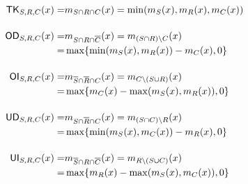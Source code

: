 \documentclass[11pt]{beamer}
\newenvironment{backblock}{%
		\begin{tcolorbox}[ 
			enhanced,
			fonttitle=\bfseries,
			colframe=gray,
			colback=gray!5!,
			colbacktitle=gray!80,
			attach boxed title to top left={yshift=-2mm, xshift=2mm}]
			\vskip2mm
			}{%
		\end{tcolorbox}
		}
\begin{document}
\begin{frame}[t]
\begin{columns}[t]
\begin{column}{0.50\linewidth}
\begin{backblock}
\begin{align*}
								\textsf{TK}_{S, R, C} (x)
								= & m_{S \cap R \cap C}(x)
								= \min(m_S(x), m_R(x), m_C (x)) \\[4\jot]
								\textsf{OD}_{S, R, C} (x)
								= & m_{S \cap R \cap \overline{C}} (x)
								= m_{(S \cap R) \setminus C} (x) \\
								= & \max\{\min(m_S (x), m_R (x)) - m_C (x), 0\} \\[4\jot]
								\textsf{OI}_{S, R, C} (x)
								= & m_{\overline{S} \cap \overline{R} \cap C} (x)
								= m_{C \setminus (S \cup R)} (x) \\
								= & \max\{m_C (x) - \max(m_S (x), m_R (x)), 0\} \\[4\jot]
								\textsf{UD}_{S, R, C} (x)
								= & m_{S \cap \overline{R} \cap C} (x)
								= m_{(S \cap C) \setminus R} (x) \\
								= & \max\{\min(m_S (x), m_C (x)) - m_R (x), 0\} \\[4\jot]
								\textsf{UI}_{S, R, C} (x)
								= & m_{\overline{S} \cap R \cap \overline{C}} (x)
								= m_{R \setminus (S \cup C)} (x) \\
								= & \max\{m_R (x) - \max(m_S (x), m_C (x)), 0\}
							\end{align*}
						\end{backblock}
					\end{column}


\end{columns}
\end{frame}
\end{document}
